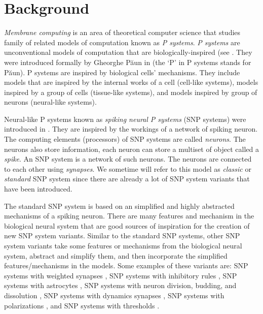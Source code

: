 \documentclass[smallextended]{svjour3}
\begin{document}

\section{Background}

\textit{Membrane computing} is an area of theoretical computer science that studies family of related models of computation known as \textit{P systems}.
\textit{P systems} are unconventional models of computation that are biologically-inspired (see \cite{HANDBOOK}. They were introduced formally by 
Gheorghe P\u{a}un in \cite{mc} (the `P' in P systems stands for P\u{a}un). P systems are inspired by biological cells' mechanisms. They include models
that are inspired by the internal works of a cell (cell-like systems), models inspired by a group of cells (tissue-like systems), and models inspired 
by group of neurons (neural-like systems).

Neural-like P systems known as \textit{spiking neural P systems} (SNP systems) were introduced in
\cite{ionescu-2006-snp}. They are inspired by the workings of a network of spiking neuron. The 
computing elements (processors) of SNP systems are called \textit{neurons}. The neurons also store 
information, each neuron can store a multiset of object called a \textit{spike}. An SNP system is a 
network of such neurons. The neurons are connected to each other using \textit{synapses}. We 
sometime will refer to this model as \textit{classic} or \textit{standard} SNP system since there 
are already a lot of SNP system variants that have been introduced.

The standard SNP system is based on an simplified and highly abstracted mechanisms of a spiking 
neuron. There are many features and mechanism in the biological neural system that are good sources
of inspiration for the creation of new SNP system variants. Similar to the standard SNP systems, 
other SNP system variants take some features or mechanisms from the biological neural system, 
abstract and simplify them, and then incorporate the simplified features/mechanisms in the models.
Some examples of these variants are: SNP systems with weighted synapses \cite{wang-2010-weights}
\cite{pan-2012-weighted-synapses}, SNP systems with inhibitory rules \cite{peng-2019-inhibitory-rules},
SNP systems with astrocytes \cite{paun-2007-astrocyte-like} \cite{pan-2012-astrocytes}, SNP systems
with neuron division, budding, and dissolution \cite{wang-2011-neuron-division,pan-2011-division-budding,zhao-2016-division-dissolution}, 
SNP systems with dynamics synapses \cite{cabarle-2015-structural-plasticity,cabarle-2017-scheduled-synapses},
SNP systems with polarizations \cite{wu-2018-polarizations}, and SNP systems with thresholds
\cite{zeng-2014-thresholds}.
\end{document}

